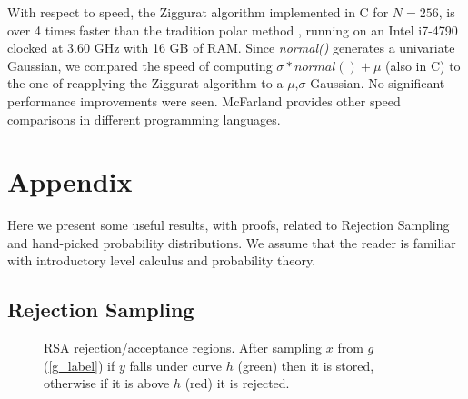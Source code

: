 \documentclass[11pt,onecolumn]{article}
\let\oldref\ref%
\def\ref{\oldref*}}
\begin{document}
With respect to speed, the Ziggurat algorithm implemented in C for $N=256$, is over 4 times faster than the tradition polar method \cite{marsaglia1964convenient}, running on an Intel i7-4790 clocked at 3.60 GHz with 16 GB of RAM. Since \textit{normal()} generates a univariate Gaussian, we compared the speed of computing $\sigma*normal()+\mu$ (also in C) to the one of reapplying the Ziggurat algorithm to a $\mu$,$\sigma$ Gaussian. No significant performance improvements were seen. McFarland \cite{mcfarland2016modified} provides other speed comparisons in different programming languages.

\section{Appendix}
Here we present some useful results, with proofs, related to Rejection Sampling and hand-picked probability distributions. We assume that the reader is familiar with introductory level calculus and probability theory.

\subsection{Rejection Sampling}\label{rsampling}
 	
\begin{figure}[h]
\centering
{}
	\caption{RSA rejection/acceptance regions. After sampling $x$ from $g$ (\ref{g_label}) if $y$ falls under curve $h$ (green) then it is stored, otherwise if it is above $h$ (red) it is rejected.}
	\label{fig:RSA}
\end{figure}
\end{document}
